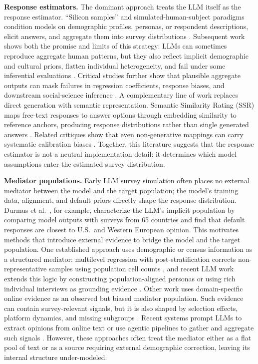 \documentclass{article}
\begin{document}
\textbf{Response estimators.}
The dominant approach treats the LLM itself as the response estimator. ``Silicon samples''
and simulated-human-subject paradigms condition models on demographic profiles, personas,
or respondent descriptions, elicit answers, and aggregate them into survey distributions
\cite{argyle2023silicon,aher2023using}. Subsequent work shows both the promise and limits
of this strategy: LLMs can sometimes reproduce aggregate human patterns, but they also
reflect implicit demographic and cultural priors, flatten individual heterogeneity, and
fail under some inferential evaluations
\cite{santurkar2023whose,yang2024specializing,brand2023llms,park2024generative}.
Critical studies further show that plausible aggregate outputs can mask failures in
regression coefficients, response biases, and downstream social-science inference
\cite{bisbee2024synthetic,tjuatja2024do,ziems2024css}. A complementary line of work
replaces direct generation with semantic representation. Semantic Similarity Rating (SSR)
maps free-text responses to answer options through embedding similarity to reference
anchors, producing response distributions rather than single generated answers
\cite{maier2026llms}. Related critiques show that even non-generative mappings can carry
systematic calibration biases \cite{verap2026ssrbias}. Together, this literature suggests
that the response estimator is not a neutral implementation detail: it determines which
model assumptions enter the estimated survey distribution.

\textbf{Mediator populations.}
Early LLM survey simulation often places no external mediator between the model and the
target population; the model's training data, alignment, and default priors directly shape
the response distribution. Durmus et al.~\cite{durmus2023global}, for example, characterize
the LLM's implicit population by comparing model outputs with surveys from 65 countries
and find that default responses are closest to U.S.\ and Western European opinion. This
motivates methods that introduce external evidence to bridge the model and the target
population. One established approach uses demographic or census information as a structured
mediator: multilevel regression with post-stratification corrects non-representative
samples using population cell counts \cite{gelman1997poststratification,wang2015forecasting},
and recent LLM work extends this logic by constructing population-aligned personas or
using rich individual interviews as grounding evidence
\cite{hwang2023aligning,park2024generative}. Other work uses domain-specific online
evidence as an observed but biased mediator population. Such evidence can contain
survey-relevant signals, but it is also shaped by selection effects, platform dynamics,
and missing subgroups \cite{diaz2016online,sen2017total}. Recent systems prompt LLMs to
extract opinions from online text or use agentic pipelines to gather and aggregate such
signals \cite{cerina2024ai,surveypilot2024}. However, these approaches often treat the
mediator either as a flat pool of text or as a source requiring external demographic
correction, leaving its internal structure under-modeled.
\end{document}
